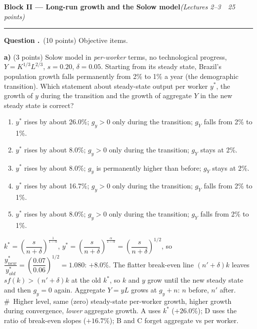 \documentclass[11pt,a4paper]{article}
\newif\ifsolucoes
\newcounter{questao}
\newcommand{\bloco}[3]{\Needspace{10\baselineskip}\bigskip\noindent
  {\large\bfseries\color{blue!55!black}Block #1 --- #2}\hfill\textit{(#3)}\par
  \noindent\rule{\linewidth}{0.3pt}\smallskip}
\newcommand{\questao}[1]{\refstepcounter{questao}\medskip\noindent
  \textbf{Question \thequestao.}~#1\par}
\newenvironment{alternativas}{\begin{enumerate}[label=\Alph*.,leftmargin=2.2em,topsep=1pt]}{\end{enumerate}}
\newcommand{\gabarito}[1]{\ifsolucoes\par\noindent\textbf{Answer:}~#1\fi}
\begin{document}
\bloco{II}{Long-run growth and the Solow model}{Lectures 2--3 \,\textbullet\, 25 points}

\questao{(10 points) Objective items.}

\textbf{a)} (3 points) Solow model in \emph{per-worker} terms, no technological progress,
$Y=K^{1/3}L^{2/3}$, $s=0.20$, $\delta=0.05$. Starting from its steady state, Brazil's population growth
falls permanently from 2\% to 1\% a year (the demographic transition). Which statement about
steady-state output per worker $y^\ast$, the growth of $y$ during the transition and the growth of
aggregate $Y$ in the new steady state is correct?
\begin{alternativas}
\item $y^\ast$ rises by about 26.0\%; $g_y>0$ only during the transition; $g_Y$ falls from 2\% to 1\%.
\item $y^\ast$ rises by about 8.0\%; $g_y>0$ only during the transition; $g_Y$ stays at 2\%.
\item $y^\ast$ rises by about 8.0\%; $g_y$ is permanently higher than before; $g_Y$ stays at 2\%.
\item $y^\ast$ rises by about 16.7\%; $g_y>0$ only during the transition; $g_Y$ falls from 2\% to 1\%.
\item $y^\ast$ rises by about 8.0\%; $g_y>0$ only during the transition; $g_Y$ falls from 2\% to 1\%.
\end{alternativas}
\gabarito{E.}
\begin{sol}
$k^\ast=\left(\dfrac{s}{n+\delta}\right)^{\frac{1}{1-\alpha}}$, $y^\ast=\left(\dfrac{s}{n+\delta}\right)^{\frac{\alpha}{1-\alpha}}
=\left(\dfrac{s}{n+\delta}\right)^{1/2}$, so
$\dfrac{y^\ast_{new}}{y^\ast_{old}}=\left(\dfrac{0.07}{0.06}\right)^{1/2}=1.080$: $\boxed{+8.0\%}$.
The flatter break-even line $(n'+\delta)k$ leaves $sf(k)>(n'+\delta)k$ at the old $k^\ast$, so $k$ and
$y$ grow until the new steady state and then $g_y=0$ again. Aggregate $Y=yL$ grows at $g_y+n$: $n$
before, $n'$ after. \#~Higher level, same (zero) steady-state per-worker growth, higher growth during
convergence, \emph{lower} aggregate growth. A uses $k^\ast$ ($+26.0\%$); D uses the ratio of
break-even slopes ($+16.7\%$); B and C forget aggregate vs per worker.
\end{sol}
\end{document}
